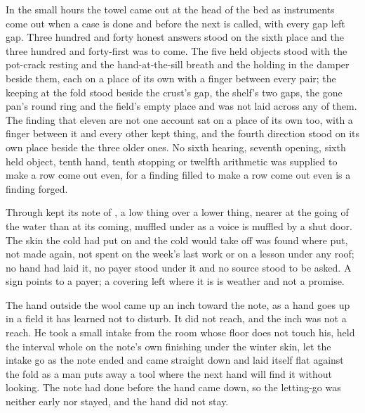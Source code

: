 In the small hours the towel came out at the head of the bed as instruments come out when a case is done and before the next is called, with every gap left gap. Three hundred and forty honest answers stood on the sixth place and the three hundred and forty-first was to come. The five held objects stood with the pot-crack resting and the hand-at-the-sill breath and the holding in the damper beside them, each on a place of its own with a finger between every pair; the keeping at the fold stood beside the crust's gap, the shelf's two gaps, the gone pan's round ring and the field's empty place and was not laid across any of them. The finding that eleven are not one account sat on a place of its own too, with a finger between it and every other kept thing, and the fourth direction stood on its own place beside the three older ones. No sixth hearing, seventh opening, sixth held object, tenth hand, tenth stopping or twelfth arithmetic was supplied to make a row come out even, for a finding filled to make a row come out even is a finding forged.

Through   kept its note of , a low thing over a lower thing, nearer at the going of the water than at its coming, muffled under  as a voice is muffled by a shut door. The skin the cold had put on and the cold would take off was found where put, not made again, not spent on the week's last work or on a lesson under any roof; no hand had laid it, no payer stood under it and no source stood to be asked. A sign points to a payer; a covering left where it is is weather and not a promise.

The hand outside the wool came up an inch toward the note, as a hand goes up in a field it has learned not to disturb. It did not reach, and the inch was not a reach. He took a small intake from the room whose floor does not touch his, held the interval whole on the note's own finishing under the winter skin, let the intake go as the note ended and came straight down and laid itself flat against the fold as a man puts away a tool where the next hand will find it without looking. The note had done before the hand came down, so the letting-go was neither early nor stayed, and the hand did not stay.


